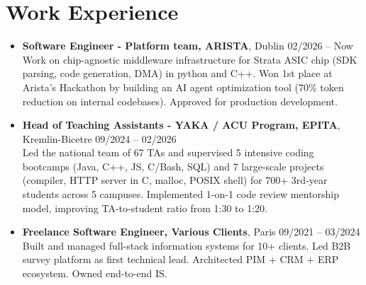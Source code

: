 \documentclass[9pt,a4paper]{article}
\begin{document}
\section*{Work Experience}
\begin{tcolorbox}[mybox]
\begin{itemize}
\item\textbf{Software Engineer - Platform team, ARISTA}, Dublin \hfill {\small02/2026 – Now}\\[0.5em]
\textcolor{gray!40!black}{Work on chip-agnostic middleware infrastructure for Strata ASIC chip  (SDK parsing, code generation, DMA) in python and C++.
Won 1st place at Arista's Hackathon by building an AI agent optimization tool (70\% token reduction on internal codebases). Approved for production development.}

\item\textbf{Head of Teaching Assistants - YAKA / ACU Program, EPITA}, Kremlin-Bicetre \hfill {\small09/2024 – 02/2026}\\[0.5em]
\textcolor{gray!40!black}{Led the national team of 67 TAs and supervised 5 intensive coding bootcamps (Java, C++, JS, C/Bash, SQL) and 7 large-scale projects (compiler, HTTP server in C, malloc, POSIX shell) for 700+ 3rd-year students across 5 campuses. Implemented 1-on-1 code review mentorship model, improving TA-to-student ratio from 1:30 to 1:20.}

\item\textbf{Freelance Software Engineer, Various Clients}, Paris \hfill {\small09/2021 – 03/2024}\\[0.5em]
\textcolor{gray!40!black}{Built and managed full-stack information systems for 10+ clients. Led B2B survey platform as first technical lead. Architected PIM + CRM + ERP ecosystem. Owned end-to-end IS.}
\end{itemize}
\end{tcolorbox}
\end{document}
